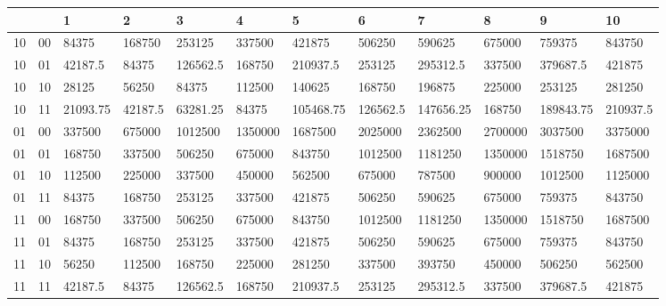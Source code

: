 \documentclass[11pt]{scrartcl}
\begin{document}
\begin{minipage}{.5\linewidth}
\begin{tabular}{p{0.3cm}|p{0.3cm}| p{1.2cm}|p{1.2cm}|p{1.2cm}|p{1.2cm}|p{1.2cm}|p{1.2cm}|p{1.2cm}|p{1.2cm}|p{1.2cm}|p{1.2cm}}

&& 1 & 2 & 3 & 4 & 5 & 6 & 7 & 8 & 9 &10 \\ \hline


10&00&84375&168750&253125&337500&421875&506250&590625&675000&759375&843750\\ \hline




10&01&42187.5&84375&126562.5&168750&210937.5&253125&295312.5&337500&379687.5&421875\\ \hline




10&10&28125&56250&84375&112500&140625&168750&196875&225000&253125&281250\\ \hline




10&11&21093.75&42187.5&63281.25&84375&105468.75&126562.5&147656.25&168750&189843.75&210937.5\\ \hline




01&00&337500&675000&1012500&1350000&1687500&2025000&2362500&2700000&3037500&3375000\\ \hline




01&01&168750&337500&506250&675000&843750&1012500&1181250&1350000&1518750&1687500\\ \hline




01&10&112500&225000&337500&450000&562500&675000&787500&900000&1012500&1125000\\ \hline




01&11&84375&168750&253125&337500&421875&506250&590625&675000&759375&843750\\ \hline




11&00&168750&337500&506250&675000&843750&1012500&1181250&1350000&1518750&1687500\\ \hline




11&01&84375&168750&253125&337500&421875&506250&590625&675000&759375&843750\\ \hline




11&10&56250&112500&168750&225000&281250&337500&393750&450000&506250&562500\\ \hline


11&11&42187.5&84375&126562.5&168750&210937.5&253125&295312.5&337500&379687.5&421875\\ 
\end{tabular}
\end{minipage}
\end{document}
